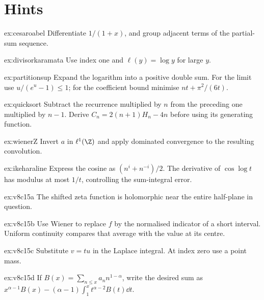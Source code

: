 \section{Hints}
\begin{hint}{ex:cesaroabel}
Differentiate $1/(1+x)$, and group adjacent terms of the partial-sum sequence.
\end{hint}
\begin{hint}{ex:divisorkaramata}
Use index one and $\ell(y)=\log y$ for large $y$.
\end{hint}
\begin{hint}{ex:partitionsup}
Expand the logarithm into a positive double sum. For the limit use $u/(e^u-1)\le1$; for the coefficient bound minimise $nt+\pi^2/(6t)$.
\end{hint}
\begin{hint}{ex:quicksort}
Subtract the recurrence multiplied by $n$ from the preceding one multiplied by $n-1$. Derive $C_n=2(n+1)H_n-4n$ before using its generating function.
\end{hint}
\begin{hint}{ex:wienerZ}
Invert $a$ in $\ell^1(\Z)$ and apply dominated convergence to the resulting convolution.
\end{hint}
\begin{hint}{ex:ikeharaline}
Express the cosine as $(n^i+n^{-i})/2$. The derivative of $\cos\log t$ has modulus at most $1/t$, controlling the sum-integral error.
\end{hint}
\begin{hint}{ex:v8c15a}
The shifted zeta function is holomorphic near the entire half-plane in question.
\end{hint}
\begin{hint}{ex:v8c15b}
Use Wiener to replace $f$ by the normalised indicator of a short interval. Uniform continuity compares that average with the value at its centre.
\end{hint}
\begin{hint}{ex:v8c15c}
Substitute $v=tu$ in the Laplace integral. At index zero use a point mass.
\end{hint}
\begin{hint}{ex:v8c15d}
If $B(x)=\sum_{n\le x}a_nn^{1-\alpha}$, write the desired sum as $x^{\alpha-1}B(x)-(\alpha-1)\int_1^xt^{\alpha-2}B(t)\dd t$.
\end{hint}

